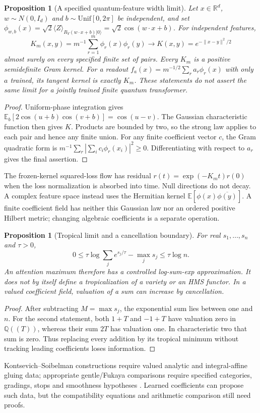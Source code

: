 \documentclass[11pt]{article}
\newtheorem{proposition}[theorem]{Proposition}
\theoremstyle{definition}\newtheorem{definition}[theorem]{Definition}
\theoremstyle{remark}\newtheorem{remark}[theorem]{Remark}
\begin{document}
\begin{proposition}[A specified quantum-feature width limit]\label{lf:kernel}
Let $x\in\mathbb R^d$, $w\sim N(0,I_d)$ and
$b\sim\mathrm{Unif}[0,2\pi]$ be independent, and set
$\phi_{w,b}(x)=\sqrt2\langle Z\rangle_{R_Y(w\cdot x+b)|0\rangle}
=\sqrt2\cos(w\cdot x+b)$. For independent features,
\[
 K_m(x,y)=m^{-1}\sum_{r=1}^m\phi_r(x)\phi_r(y)
 \longrightarrow K(x,y)=e^{-\|x-y\|^2/2}
\]
almost surely on every specified finite set of pairs. Every $K_m$ is a
positive semidefinite Gram kernel. For a readout
$f_a(x)=m^{-1/2}\sum_r a_r\phi_r(x)$ with only $a$ trained, its tangent
kernel is exactly $K_m$. These statements do not assert the same limit
for a jointly trained finite quantum transformer.
\end{proposition}
\begin{proof}
Uniform-phase integration gives
$\mathbb E_b[2\cos(u+b)\cos(v+b)]=\cos(u-v)$.
The Gaussian characteristic function then gives $K$. Products are bounded
by two, so the strong law applies to each pair and hence any finite union.
For any finite coefficient vector $c$, the Gram quadratic form is
$m^{-1}\sum_r|\sum_i c_i\phi_r(x_i)|^2\geq0$.
Differentiating with respect to $a_r$ gives the final assertion.
\end{proof}
The frozen-kernel squared-loss flow has residual
$r(t)=\exp(-K_m t)r(0)$ when the loss normalization is absorbed into time.
Null directions do not decay. A complex feature space instead uses the
Hermitian kernel $\mathbb E[\phi(x)\overline{\phi(y)}]$.
A finite coefficient field has neither this Gaussian law nor an ordered
positive Hilbert metric; changing algebraic coefficients is a separate operation.

\begin{proposition}[Tropical limit and a cancellation boundary]\label{lf:tropical}
For real $s_1,\ldots,s_n$ and $\tau>0$,
\[
 0\leq\tau\log\sum_j e^{s_j/\tau}-\max_j s_j\leq\tau\log n.
\]
An attention maximum therefore has a controlled log-sum-exp approximation.
It does not by itself define a tropicalization of a variety or an HMS functor.
In a valued coefficient field, valuation of a sum can increase by cancellation.
\end{proposition}
\begin{proof}
After subtracting $M=\max s_j$, the exponential sum lies between one and $n$.
For the second statement, both $1+T$ and $-1+T$ have valuation zero in
$\mathbb Q((T))$, whereas their sum $2T$ has valuation one. In characteristic
two that sum is zero. Thus replacing every addition by its tropical minimum
without tracking leading coefficients loses information.
\end{proof}
Kontsevich--Soibelman constructions require valued analytic and
integral-affine gluing data; appropriate gentle/Fukaya comparisons require
specified categories, gradings, stops and smoothness hypotheses
\cite{LFAffine,LFQNTK,LFFukaya}. Learned coefficients can propose such data,
but the compatibility equations and arithmetic comparison still need proofs.
\end{document}
